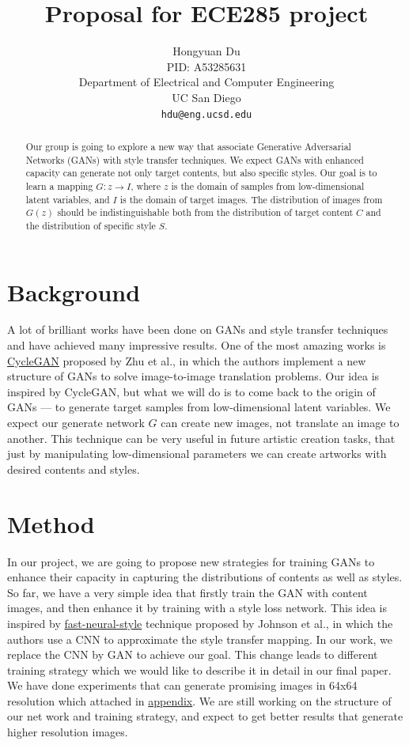 \documentclass{article}
\title{Proposal for ECE285 project}
\author{
  Hongyuan Du \\
  PID: A53285631\\
  Department of Electrical and Computer Engineering\\
  UC San Diego\\
  \texttt{hdu@eng.ucsd.edu} \\
}
\begin{document}

\maketitle

\begin{abstract}
Our group is going to explore a new way that associate Generative Adversarial Networks (GANs) with style transfer techniques. We expect GANs with enhanced capacity can generate not only target contents, but also specific styles. Our goal is to learn a mapping $G: z \to I$, where $z$ is the domain of samples from low-dimensional latent variables, and $I$ is the domain of target images. The distribution of images from $G(z)$ should be indistinguishable both from the distribution of target content $C$ and the distribution of specific style $S$.
\end{abstract}

\section{Background}

A lot of brilliant works have been done on GANs and style transfer techniques and have achieved many impressive results. One of the most amazing works is \href{https://arxiv.org/pdf/1703.10593.pdf}{CycleGAN} proposed by Zhu et al., in which the authors implement a new structure of GANs to solve image-to-image translation problems. Our idea is inspired by CycleGAN, but what we will do is to come back to the origin of GANs --- to generate target samples from low-dimensional latent variables. We expect our generate network $G$ can create new images, not translate an image to another. This technique can be very useful in future artistic creation tasks, that just by manipulating low-dimensional parameters we can create artworks with desired contents and styles.

\section{Method}

In our project, we are going to propose new strategies for training GANs to enhance their capacity in capturing the distributions of contents as well as styles. So far, we have a very simple idea that firstly train the GAN with content images, and then enhance it by training with a style loss network. This idea is inspired by \href{https://arxiv.org/pdf/1603.08155.pdf}{fast-neural-style} technique proposed by Johnson et al., in which the authors use a CNN to approximate the style transfer mapping. In our work, we replace the CNN by GAN to achieve our goal. This change leads to different training strategy which we would like to describe it in detail in our final paper. We have done experiments that can generate promising images in 64x64 resolution which attached in \hyperref[ap]{appendix}. We are still working on the structure of our net work and training strategy, and expect to get better results that generate higher resolution images.
\end{document}
